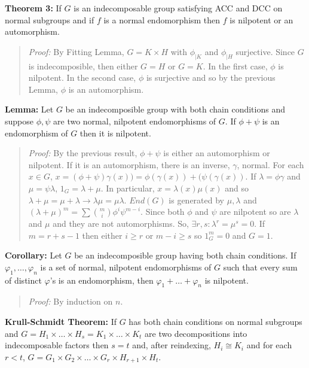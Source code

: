 {\bf Theorem 3:}
If $G$ is an indecomposable group satisfying ACC and DCC on normal subgroups
and if $f$ is a normal endomorphism then $f$ is nilpotent or an automorphism.
\begin{quote}
\emph{Proof:}  
By Fitting Lemma, $G= K \times H$ with $\phi_{|K}$ and $\phi_{|H}$ surjective.
Since $G$ is indecomposible, then either $G=H$ or $G=K$.  In the first case,
$\phi$ is nilpotent.  In the second case, $\phi$ is surjective and so by the previous Lemma,
$\phi$ is an automorphism.
\end{quote}
{\bf Lemma:} Let $G$ be an indecomposible group with both chain conditions and
suppose $\phi, \psi$ are two normal, nilpotent endomorphisms of $G$.  If $\phi+\psi$ is
an endomorphism of $G$ then it is nilpotent.
\begin{quote}
\emph{Proof:}  
By the previous result, 
$\phi+\psi$ is either an automorphism or nilpotent.
If it is an automorphism, there is an inverse, $\gamma$, normal.
For each $x \in G$, $x= (\phi+\psi) \gamma(x))= \phi(\gamma(x)) + (\psi(\gamma(x))$. 
If $\lambda= \phi \gamma$  and $\mu= \psi \lambda$,
$1_G= \lambda+\mu$.  In particular,
$x= \lambda(x) \mu(x)$ and so $\lambda+\mu= \mu+\lambda \rightarrow \lambda \mu = \mu \lambda$.
$End(G)$ is generated by $\mu, \lambda$ and 
$(\lambda + \mu)^m = \sum {m \choose i} \phi^i \psi^{m-i}$.  Since both
$\phi$ and $\psi$ are nilpotent so are $\lambda$ and $\mu$ and they are not automorphisms.
So, $\exists r, s: \lambda^r=\mu^s=0$.  If $m=r+s-1$ then either
$i \ge r$ or $m-i \ge s$ so $1_G^m =0$ and $G=1$.
\end{quote}
{\bf Corollary:}  Let $G$ be an indecomposible group having both chain conditions.
If $ \varphi_1, \ldots, \varphi_n $
is a set of normal, nilpotent endomorphisms of $G$ such that every sum of distinct
$\varphi$'s is an endomorphism, then
$ \varphi_1 + \ldots + \varphi_n $ is nilpotent.
\begin{quote}
\emph{Proof:}  By induction on $n$.
\end{quote}
{\bf Krull-Schmidt Theorem:}  If $G$ has both chain conditions on normal subgroups and
$G= H_1 \times \ldots \times H_s = K_1 \times \ldots \times K_t$ are
two decompositions into indecomposable factors then $s=t$ and, after
reindexing, $H_i \cong K_i$ and for each $r<t$, $G= G_1 \times G_2 \times \ldots
\times G_r \times H_{r+1} \times H_t$. 
